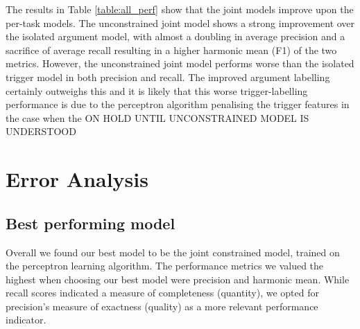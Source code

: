 \documentclass{article} %
\begin{document}
\begin{table}[htb]
\centering
\caption{Performance of models}
\label{table:all_perf}
\end{table}
The results in Table \ref{table:all_perf} show that the joint models improve upon the per-task models. The unconstrained joint model shows a strong improvement over the isolated argument model, with almost a doubling in average precision and a sacrifice of average recall resulting in a higher harmonic mean (F1) of the two metrics. However, the unconstrained joint model performs worse than the isolated trigger model in both precision and recall. The improved argument labelling certainly outweighs this and it is likely that this worse trigger-labelling performance is due to the perceptron algorithm penalising the trigger features in the case when the ON HOLD UNTIL UNCONSTRAINED MODEL IS UNDERSTOOD

\section{Error Analysis}
\subsection{Best performing model}
Overall we found our best model to be the joint constrained model, trained on the perceptron learning algorithm. The performance metrics we valued the highest when choosing our best model were precision and harmonic mean. While recall scores indicated a measure of completeness (quantity), we opted for precision's measure of exactness (quality) as a more relevant performance indicator.
\end{document}
